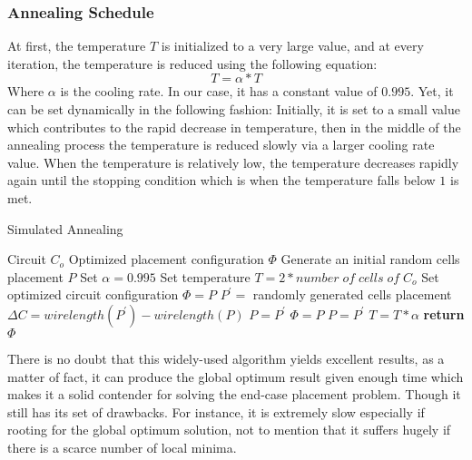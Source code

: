 \documentclass[conference]{IEEEtran}
\begin{document}
\subsubsection{Annealing Schedule}

At first, the temperature $T$ is initialized to a very large value, and at every iteration, the temperature is reduced using the following equation:
\begin{equation}
    T = \alpha*T
\end{equation}
Where $\alpha$ is the cooling rate. In our case, it has a constant value of $0.995$. Yet, it can be set dynamically in the following fashion: Initially, it is set to a small value which contributes to the rapid decrease in temperature, then in the middle of the annealing process the temperature is reduced slowly via a larger cooling rate value. When the temperature is relatively low, the temperature decreases rapidly again until the stopping condition which is when the temperature falls below $1$ is met.

\medskip

\begin{algorithm}[H]
    \caption{Simulated Annealing}
    \begin{algorithmic}[1]
    \renewcommand{\algorithmicrequire}{\textbf{Input:}}
    \renewcommand{\algorithmicensure}{\textbf{Output:}}
    \Require Circuit $C_{o}$
    \Ensure  Optimized placement configuration $\Phi$
       \State Generate an initial random cells placement $P$
     \State Set $\alpha = 0.995$
     \State Set temperature $T = 2 * number\; of\; cells\; of\; C_{o}$
     \State Set optimized circuit configuration $\Phi = P$
       \State $P^{'} = $ randomly generated cells placement
       \State $\Delta C = wirelength(P^{'}) - wirelength(P)$
           \State $P = P^{'}$
               \State $\Phi = P$
           \EndIf
           \State $P = P^{'}$
       \EndIf
       \State $T = T * \alpha$
     \EndWhile
    \State \textbf{return} $\Phi$
    \end{algorithmic} 
    \end{algorithm}

There is no doubt that this widely-used algorithm yields excellent results, as a matter of fact, it can produce the global optimum result given enough time which makes it a solid contender for solving the end-case placement problem. Though it still has its set of drawbacks. For instance, it is extremely slow especially if rooting for the global optimum solution, not to mention that it suffers hugely if there is a scarce number of local minima.
\end{document}
